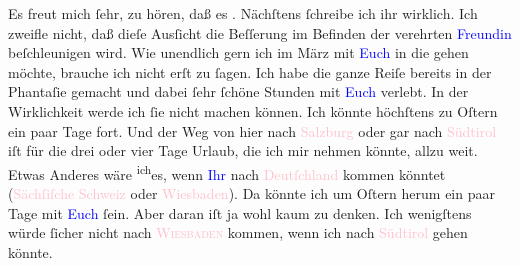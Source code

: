 \pstart
           Es freut mich ſehr, zu hören, daß es \label{K_L03198-3v}\label{K_L03198-3h}. Nächſtens ſchreibe ich ihr wirklich. Ich zweifle nicht, daß dieſe Ausſicht
               die Beſſerung im Befinden der verehrten \textcolor{blue}{Freundin}{}\ledrightnote{{$\rightarrow$}\textcolor{blue}{Olga Schnitzler}} beſchleunigen wird. Wie unendlich gern ich im März mit \textcolor{blue}{Euch}{}\ledrightnote{{$\rightarrow$}\textcolor{blue}{Olga Schnitzler}} in die \label{K_L03198-4v}\label{K_L03198-4h} gehen möchte,
               brauche ich nicht erſt zu ſagen. Ich habe die ganze Reiſe bereits in der Phantaſie
               gemacht und dabei ſehr ſchöne Stunden mit \textcolor{blue}{Euch}{}\ledrightnote{{$\rightarrow$}\textcolor{blue}{Olga Schnitzler}} verlebt. In der Wirklichkeit werde ich ſie nicht machen
               können. Ich könnte höchſtens zu Oſtern ein paar Tage fort. Und der Weg von hier nach
                  \textcolor{pink}{Salzburg}{}\ledrightnote{\textcolor{pink}{Salzburg}} oder gar {\pb}nach \textcolor{pink}{Südtirol}{}\ledrightnote{\textcolor{pink}{Südtirol}}
               iſt für die drei oder vier Tage Urlaub, die ich mir nehmen könnte, allzu weit. Etwas
               Anderes wäre \substVorne{}\textsuperscript{ich}\substDazwischen{}es\substHinten{}, wenn \textcolor{blue}{Ihr}{}\ledrightnote{{$\rightarrow$}\textcolor{blue}{Olga Schnitzler}} nach \textcolor{pink}{Deutſchland}{}\ledrightnote{\textcolor{pink}{Deutschland}} kommen könntet (\textcolor{pink}{Sächſiſche Schweiz}{}\ledrightnote{\textcolor{pink}{Sächsische Schweiz}}\strikeout{,} oder \textcolor{pink}{Wiesbaden}{}\ledrightnote{\textcolor{pink}{Wiesbaden}}). Da könnte ich um Oſtern herum ein paar Tage mit \textcolor{blue}{Euch}{}\ledrightnote{\textcolor{blue}{Olga Schnitzler}} ſein. Aber daran iſt ja wohl kaum zu denken. Ich
               wenigſtens würde ſicher nicht nach \textsc{\textcolor{pink}{Wiesbaden}{}\ledrightnote{\textcolor{pink}{Wiesbaden}}} kommen, wenn ich nach \textcolor{pink}{Südtirol}{}\ledrightnote{\textcolor{pink}{Südtirol}} gehen
               könnte.\pend
           
